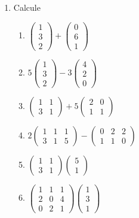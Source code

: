 \documentclass[12pt]{article}
\theoremstyle{exampstyle}
\theoremstyle{definition}
\theoremstyle{break}
\numberwithin{equation}{section}
\begin{document}
\begin{enumerate}
    \item Calcule
    \begin{enumerate}
        \item $\begin{pmatrix} 1 \\ 3 \\ 2 \end{pmatrix}+\begin{pmatrix} 0 \\ 6 \\ 1 \end{pmatrix}$
        \item $5 \begin{pmatrix} 1 \\ 3 \\ 2 \end{pmatrix} - 3 \begin{pmatrix} 4 \\ 2 \\ 0 \end{pmatrix}$
        \item $\begin{pmatrix} 1 & 1 \\ 3 & 1 \end{pmatrix} + 5 \begin{pmatrix} 2 & 0 \\ 1 & 1 \end{pmatrix}$
        \item $2\begin{pmatrix} 1 & 1 & 1 \\ 3 & 1 & 5 \end{pmatrix} - \begin{pmatrix} 0 & 2 & 2 \\ 1 & 1 & 0 \end{pmatrix}$
        \item $\begin{pmatrix} 1 & 1 \\ 3 & 1 \end{pmatrix} \begin{pmatrix} 5 \\ 1 \end{pmatrix}$
        \item $\begin{pmatrix} 1 & 1 & 1 \\ 2 & 0 & 4 \\ 0 & 2 & 1 \end{pmatrix} \begin{pmatrix} 1 \\ 3 \\ 1 \end{pmatrix}$
    \end{enumerate}
\end{enumerate}
\end{document}
